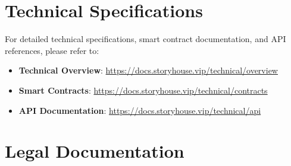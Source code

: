 \documentclass[12pt,a4paper]{article}
\begin{document}
\tableofcontents
\newpage


\newpage


\newpage


\newpage


\newpage


\newpage


\newpage


\newpage


\newpage


\newpage


\newpage


\newpage


\newpage

% 
% 

\appendix

\section{Technical Specifications}
\label{appendix:technical}

For detailed technical specifications, smart contract documentation, and API references, please refer to:

\begin{itemize}
    \item \textbf{Technical Overview}: \url{https://docs.storyhouse.vip/technical/overview}
    \item \textbf{Smart Contracts}: \url{https://docs.storyhouse.vip/technical/contracts}
    \item \textbf{API Documentation}: \url{https://docs.storyhouse.vip/technical/api}
\end{itemize}

\section{Legal Documentation}
\label{appendix:legal}
\end{document}

